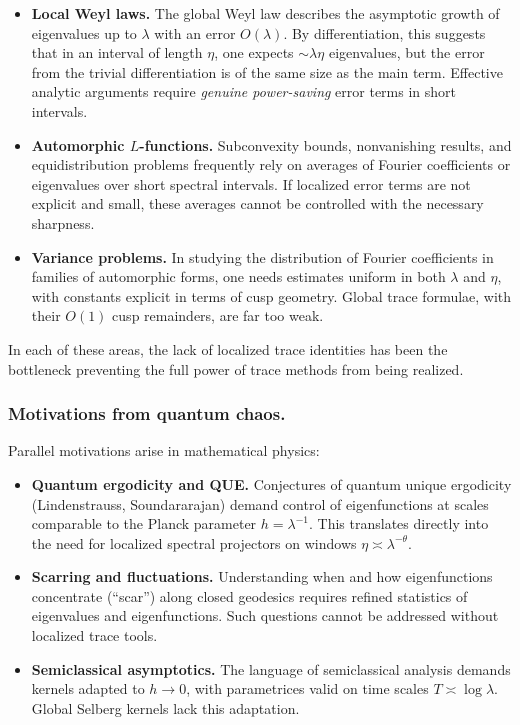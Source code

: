 \begin{itemize}
  \item \textbf{Local Weyl laws.} The global Weyl law describes the asymptotic
  growth of eigenvalues up to $\lambda$ with an error $O(\lambda)$. By
  differentiation, this suggests that in an interval of length $\eta$, one
  expects $\sim \lambda\eta$ eigenvalues, but the error from the trivial
  differentiation is of the same size as the main term. Effective analytic
  arguments require \emph{genuine power-saving} error terms in short intervals.

  \item \textbf{Automorphic $L$-functions.} Subconvexity bounds, nonvanishing
  results, and equidistribution problems frequently rely on averages of Fourier
  coefficients or eigenvalues over short spectral intervals. If localized error
  terms are not explicit and small, these averages cannot be controlled with
  the necessary sharpness.

  \item \textbf{Variance problems.} In studying the distribution of Fourier
  coefficients in families of automorphic forms, one needs estimates uniform in
  both $\lambda$ and $\eta$, with constants explicit in terms of cusp geometry.
  Global trace formulae, with their $O(1)$ cusp remainders, are far too weak.
\end{itemize}

In each of these areas, the lack of localized trace identities has been the
bottleneck preventing the full power of trace methods from being realized.

\subsubsection*{Motivations from quantum chaos.}
Parallel motivations arise in mathematical physics:

\begin{itemize}
  \item \textbf{Quantum ergodicity and QUE.} Conjectures of quantum unique
  ergodicity (Lindenstrauss, Soundararajan) demand control of eigenfunctions at
  scales comparable to the Planck parameter $h=\lambda^{-1}$. This translates
  directly into the need for localized spectral projectors on windows
  $\eta\asymp\lambda^{-\theta}$.

  \item \textbf{Scarring and fluctuations.} Understanding when and how
  eigenfunctions concentrate (“scar”) along closed geodesics requires refined
  statistics of eigenvalues and eigenfunctions. Such questions cannot be
  addressed without localized trace tools.

  \item \textbf{Semiclassical asymptotics.} The language of semiclassical
  analysis demands kernels adapted to $h\to0$, with parametrices valid on time
  scales $T\asymp\log\lambda$. Global Selberg kernels lack this adaptation.
\end{itemize}

